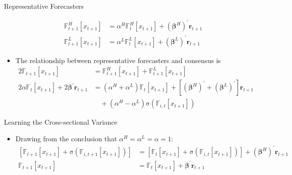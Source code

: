 \documentclass[UTF8, 10pt]{beamer}
\begin{document}
\begin{CJK*}{UTF8}{gbsn}
\begin{frame}{Representative Forecasters}
\begin{itemize}
			$$
			\begin{aligned}
			    \mathbb{F}^H_{t+1}\left[x_{t+1}\right]
			    & = \alpha^H \mathbb{F}_{t}^H\left[x_{t+1}\right] + (\boldsymbol{\beta}^H)^{\prime}\mathbf{r}_{t+1}
			    \\
			    \mathbb{F}^L_{t+1}\left[x_{t+1}\right]
			    & = \alpha^L \mathbb{F}_{t}^L\left[x_{t+1}\right] + (\boldsymbol{\beta}^L)^{\prime}\mathbf{r}_{t+1}
			\end{aligned}
			$$
		\item The \alert{relationship} between representative forecasters and consensus is
			$$
			\begin{aligned}
		        2 \mathbb{F}_{t+1}\left[x_{t+1}\right]
		        & =
		        \mathbb{F}_{t+1}^{H}\left[x_{t+1}\right] + \mathbb{F}_{t+1}^{L}\left[x_{t+1}\right]
		        \\
		        2 \alpha \mathbb{F}_{t}\left[x_{t+1}\right] 
		        + 2 \boldsymbol{\beta}^{\prime}\mathbf{r}_{t+1}
		        & = 
		        (\alpha^H+\alpha^L) \mathbb{F}_{t}\left[x_{t+1}\right]
		        +
		        \left[(\boldsymbol{\beta}^H)^{\prime}+(\boldsymbol{\beta}^L)^{\prime}\right]\mathbf{r}_{t+1}
		        \\
		        &\quad +
		        (\alpha^H-\alpha^L) \mathrm{\sigma}\left(\mathbb{F}_{i, t}\left[x_{t+1}\right]\right)
		    \end{aligned}
			$$
	\end{itemize}
\end{frame}
\begin{frame}{Learning the Cross-sectional Variance}
	\begin{itemize}
		\item Drawing from the conclusion that $\alpha^H=\alpha^L=\alpha=1$:
			$$
			\begin{aligned}
		        \left[
		        \mathbb{F}_{t+1}\left[x_{t+1}\right] + \mathrm{\sigma}\left(\mathbb{F}_{i, t+1}\left[x_{t+1}\right]\right)
		        \right]
		        & = 
		        \left[
		        \mathbb{F}_{t}\left[x_{t+1}\right] + \mathrm{\sigma}\left(\mathbb{F}_{i, t}\left[x_{t+1}\right]\right)
		        \right]
		        + (\boldsymbol{\beta}^H)^{\prime}\mathbf{r}_{t+1}
		        \\
		        \mathbb{F}_{t+1}\left[x_{t+1}\right]
		        & = 
		        \mathbb{F}_{t}\left[x_{t+1}\right]
		        + \boldsymbol{\beta}^{\prime}\mathbf{r}_{t+1}

\end{aligned}$$
\end{itemize}
\end{frame}
\end{CJK*}
\end{document}
